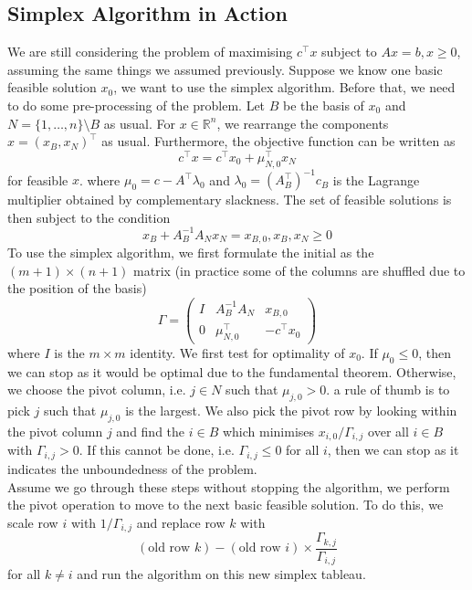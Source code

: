 \subsection{Simplex Algorithm in Action}
We are still considering the problem of maximising $c^\top x$ subject to $Ax=b,x\ge 0$, assuming the same things we assumed previously.
Suppose we know one basic feasible solution $x_0$, we want to use the simplex algorithm.
Before that, we need to do some pre-processing of the problem.
Let $B$ be the basis of $x_0$ and $N=\{1,\ldots,n\}\setminus B$ as usual.
For $x\in\mathbb R^n$, we rearrange the components $x=(x_B,x_N)^\top$ as usual.
Furthermore, the objective function can be written as
$$c^\top x=c^\top x_0+\mu_{N,0}^\top x_N$$
for feasible $x$.
where $\mu_0=c-A^\top\lambda_0$ and $\lambda_0=(A_B^\top)^{-1}c_B$ is the Lagrange multiplier obtained by complementary slackness.
The set of feasible solutions is then subject to the condition
$$x_B+A_B^{-1}A_Nx_N=x_{B,0},x_B,x_N\ge 0$$
To use the simplex algorithm, we first formulate the initial  as the $(m+1)\times(n+1)$ matrix (in practice some of the columns are shuffled due to the position of the basis)
$$\Gamma=\begin{pmatrix}
    I&A_B^{-1}A_N&x_{B,0}\\
    0&\mu_{N,0}^\top&-c^\top x_0
\end{pmatrix}$$
where $I$ is the $m\times m$ identity.
We first test for optimality of $x_0$.
If $\mu_0\le 0$, then we can stop as it would be optimal due to the fundamental theorem.
Otherwise, we choose the pivot column, i.e. $j\in N$ such that $\mu_{j,0}>0$.
a rule of thumb is to pick $j$ such that $\mu_{j,0}$ is the largest.
We also pick the pivot row by looking within the pivot column $j$ and find the $i\in B$ which minimises $x_{i,0}/\Gamma_{i,j}$ over all $i\in B$ with $\Gamma_{i,j}>0$.
If this cannot be done, i.e. $\Gamma_{i,j}\le 0$ for all $i$, then we can stop as it indicates the unboundedness of the problem.\\
Assume we go through these steps without stopping the algorithm, we perform the pivot operation to move to the next basic feasible solution.
To do this, we scale row $i$ with $1/\Gamma_{i,j}$ and replace row $k$ with
$$(\text{old row }k)-(\text{old row }i)\times\frac{\Gamma_{k,j}}{\Gamma_{i,j}}$$
for all $k\neq i$ and run the algorithm on this new simplex tableau.
